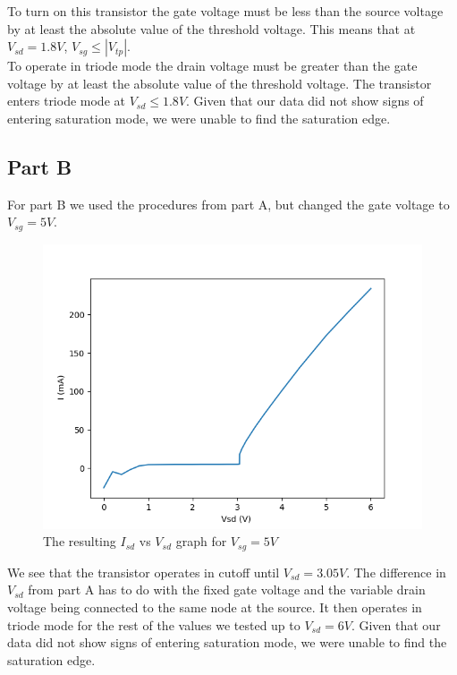 \FloatBarrier
To turn on this transistor the gate voltage must be less than the source voltage by at least the absolute value of the threshold voltage. 
This means that at $V_{sd} = 1.8 V$, $V_{sg} \le |V_{tp}|$.
\\
To operate in triode mode the drain voltage must be greater than the gate voltage by at least the absolute value of the threshold voltage.
The transistor enters triode mode at $ V_{sd} \le 1.8V$.
Given that our data did not show signs of entering saturation mode, we were unable to find the saturation edge.
\subsection{Part B}
For part B we used the procedures from part A, but changed the gate voltage to $V_{sg} = 5 V$. 

\FloatBarrier

\begin{figure}[h!]
	\centering
	\includegraphics[scale=0.75]{../data/pmos_5v.png}
	\caption{The resulting $I_{sd}$ vs $V_{sd}$ graph for $V_{sg}=5V$}
	\label{fig:pmos_5v}
\end{figure}

\FloatBarrier
We see that the transistor operates in cutoff until $V_{sd} = 3.05 V$.
The difference in $V_{sd}$ from part A has to do with the fixed gate voltage and the variable drain voltage being connected to the same node at the source.
It then operates in triode mode for the rest of the values we tested up to $V_{sd}=6V$.
Given that our data did not show signs of entering saturation mode, we were unable to find the saturation edge.
